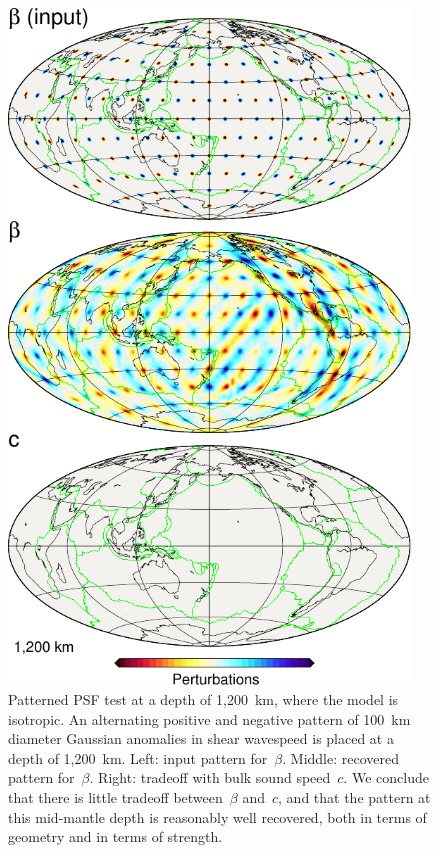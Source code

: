 \documentclass[extra,mreferee]{gji}
\begin{document}
\begin{figure}
  \centering
  \includegraphics[width=0.95\textwidth]{figures/psf/psf-1200km.pdf}
  \caption{\small{Patterned PSF test at a depth of 1,200~km,
  where the model is isotropic.
    An alternating positive and negative pattern of 100~km diameter Gaussian anomalies in shear wavespeed is placed at a depth of 1,200~km.
  Left: input pattern for~$\beta$.
  Middle: recovered pattern for~$\beta$.
  Right: tradeoff with bulk sound speed~$c$.
  We conclude that there is little tradeoff between~$\beta$ and~$c$, and that the pattern at this mid-mantle depth is reasonably well recovered, both in terms of geometry and in terms of strength.
  }}
  \label{fig:patern1200}
\end{figure}
\end{document}
